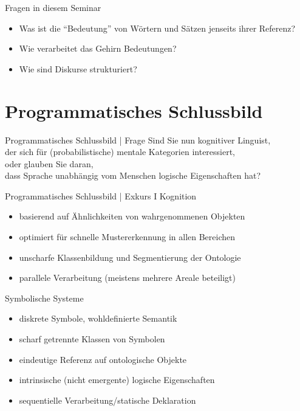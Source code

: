 \begin{frame}
  { Fragen in diesem Seminar}
  \onslide<+->
  \begin{itemize}[<+->]
    \item Was ist die "`Bedeutung"' von Wörtern und Sätzen jenseits ihrer Referenz?
    \item Wie verarbeitet das Gehirn Bedeutungen?
    \item Wie sind Diskurse strukturiert?
  \end{itemize}
\end{frame}

\section{Programmatisches Schlussbild}

\begin{frame}
  {Programmatisches Schlussbild | Frage}
  \onslide<+->
  \onslide<+->
  \centering\large
  Sind Sie nun kognitiver Linguist,\\
  der sich für (probabilistische) \alert{mentale Kategorien} interessiert,\\
  \Halbzeile
  \onslide<+->
  oder glauben Sie daran,\\
  dass Sprache \alert{unabhängig vom Menschen logische Eigenschaften} hat?\\
  \onslide<+->
  \Zeile
\end{frame}

\begin{frame}
  {Programmatisches Schlussbild | Exkurs I}
  \onslide<+->
  \onslide<+->
  \alert{Kognition}\\
  \Viertelzeile
  \begin{itemize}[<+->]
    \item basierend auf Ähnlichkeiten von wahrgenommenen Objekten
    \item optimiert für schnelle Mustererkennung \alert{in allen Bereichen}
    \item unscharfe Klassenbildung und Segmentierung der Ontologie
    \item parallele Verarbeitung (meistens mehrere Areale beteiligt)
  \end{itemize}
  \Halbzeile 
  \onslide<+->
  \alert{Symbolische Systeme}\\
  \Viertelzeile
  \begin{itemize}[<+->]
    \item diskrete Symbole, wohldefinierte Semantik
    \item scharf getrennte Klassen von Symbolen
    \item eindeutige Referenz auf ontologische Objekte
    \item intrinsische (nicht emergente) logische Eigenschaften\\
    \item sequentielle Verarbeitung\slash statische Deklaration\\
  \end{itemize}
\end{frame}

